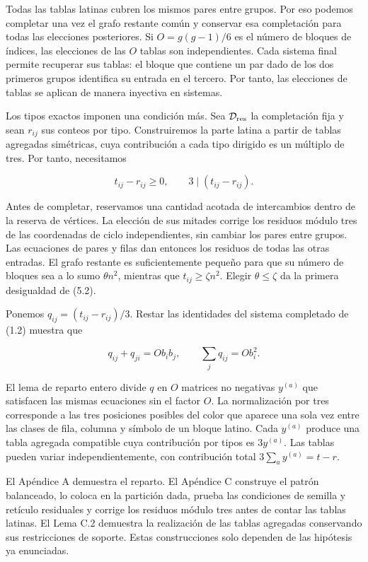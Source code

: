 \documentclass[spanish,11pt,a4paper]{article}
\begin{document}
Todas las tablas latinas cubren los mismos pares entre grupos. Por eso podemos completar una vez el grafo restante común y conservar esa completación para todas las elecciones posteriores. Si \(O=g(g-1)/6\) es el número de bloques de índices, las elecciones de las \(O\) tablas son independientes. Cada sistema final permite recuperar sus tablas: el bloque que contiene un par dado de los dos primeros grupos identifica su entrada en el tercero. Por tanto, las elecciones de tablas se aplican de manera inyectiva en sistemas.

Los tipos exactos imponen una condición más. Sea \(\mathcal D_{\rm res}\) la completación fija y sean \(r_{ij}\) sus conteos por tipo. Construiremos la parte latina a partir de tablas agregadas simétricas, cuya contribución a cada tipo dirigido es un múltiplo de tres. Por tanto, necesitamos

\[t_{ij}-r_{ij}\ge0,\qquad 3\mid(t_{ij}-r_{ij}).\tag{5.2}\]

Antes de completar, reservamos una cantidad acotada de intercambios dentro de la reserva de vértices. La elección de sus mitades corrige los residuos módulo tres de las coordenadas de ciclo independientes, sin cambiar los pares entre grupos. Las ecuaciones de pares y filas dan entonces los residuos de todas las otras entradas. El grafo restante es suficientemente pequeño para que su número de bloques sea a lo sumo \(\theta n^2\), mientras que \(t_{ij}\ge\zeta n^2\). Elegir \(\theta\le\zeta\) da la primera desigualdad de (5.2).

Ponemos \(q_{ij}=(t_{ij}-r_{ij})/3\). Restar las identidades del sistema completado de (1.2) muestra que

\[q_{ij}+q_{ji}=O b_ib_j,\qquad \sum_jq_{ij}=O b_i^2.\]

El lema de reparto entero divide \(q\) en \(O\) matrices no negativas \(y^{(a)}\) que satisfacen las mismas ecuaciones sin el factor \(O\). La normalización por tres corresponde a las tres posiciones posibles del color que aparece una sola vez entre las clases de fila, columna y símbolo de un bloque latino. Cada \(y^{(a)}\) produce una tabla agregada compatible cuya contribución por tipos es \(3y^{(a)}\). Las tablas pueden variar independientemente, con contribución total \(3\sum_a y^{(a)}=t-r\).

El Apéndice A demuestra el reparto. El Apéndice C construye el patrón balanceado, lo coloca en la partición dada, prueba las condiciones de semilla y retículo residuales y corrige los residuos módulo tres antes de contar las tablas latinas. El Lema C.2 demuestra la realización de las tablas agregadas conservando sus restricciones de soporte. Estas construcciones solo dependen de las hipótesis ya enunciadas.
\end{document}
